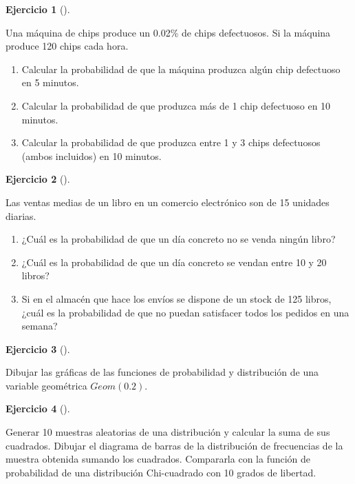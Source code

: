 \documentclass[
  a4paper,
]{scrreport}
\theoremstyle{definition}
\newtheorem{exercise}{Ejercicio}[chapter]
\theoremstyle{remark}
\begin{document}
\begin{exercise}[]\protect\hypertarget{exr-distribuciones-probabilidad-7}{}\label{exr-distribuciones-probabilidad-7}

Una máquina de chips produce un 0.02\% de chips defectuosos. Si la
máquina produce 120 chips cada hora.

\begin{enumerate}
\def\labelenumi{\alph{enumi}.}
\item
  Calcular la probabilidad de que la máquina produzca algún chip
  defectuoso en 5 minutos.
\item
  Calcular la probabilidad de que produzca más de 1 chip defectuoso en
  10 minutos.
\item
  Calcular la probabilidad de que produzca entre 1 y 3 chips defectuosos
  (ambos incluidos) en 10 minutos.
\end{enumerate}

\end{exercise}

\begin{exercise}[]\protect\hypertarget{exr-distribuciones-probabilidad-8}{}\label{exr-distribuciones-probabilidad-8}

Las ventas medias de un libro en un comercio electrónico son de 15
unidades diarias.

\begin{enumerate}
\def\labelenumi{\alph{enumi}.}
\item
  ¿Cuál es la probabilidad de que un día concreto no se venda ningún
  libro?
\item
  ¿Cuál es la probabilidad de que un día concreto se vendan entre 10 y
  20 libros?
\item
  Si en el almacén que hace los envíos se dispone de un stock de 125
  libros, ¿cuál es la probabilidad de que no puedan satisfacer todos los
  pedidos en una semana?
\end{enumerate}

\end{exercise}

\begin{exercise}[]\protect\hypertarget{exr-distribuciones-probabilidad-9}{}\label{exr-distribuciones-probabilidad-9}

Dibujar las gráficas de las funciones de probabilidad y distribución de
una variable geométrica \(Geom(0.2)\).

\end{exercise}

\begin{exercise}[]\protect\hypertarget{exr-distribuciones-probabilidad-10}{}\label{exr-distribuciones-probabilidad-10}

Generar 10 muestras aleatorias de una distribución y calcular la suma de
sus cuadrados. Dibujar el diagrama de barras de la distribución de
frecuencias de la muestra obtenida sumando los cuadrados. Compararla con
la función de probabilidad de una distribución Chi-cuadrado con 10
grados de libertad.

\end{exercise}
\end{document}
